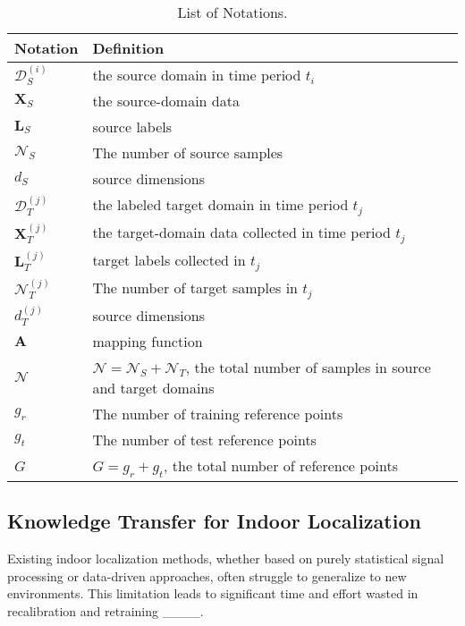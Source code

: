 \begin{table}[!t]
	\centering
	\caption{List of Notations.} %
	\label{List of Notations}
	\renewcommand{\arraystretch}{1.2} %
	\begin{tabular}{p{1.5cm} p{6.5cm}} %
		\toprule
		\textbf{Notation}   & \textbf{Definition} \\
		\midrule
		
		$\mathcal{D}_S^{\left( i \right)}$ & the source domain in time period $ t_i $  \\ 
		$\mathbf{X}_{S}$ & the source-domain data \\
		$\boldsymbol{L}_{S}$ & source labels \\
		$\mathcal{N}_S$ & The number of source samples \\
		$d_S$ & source dimensions \\
		\midrule
		
		$\mathcal{D}_{T}^{\left( j \right)}$ & the labeled target domain in time period $ t_j $ \\
		$\mathbf{X}_{T}^{\left( j \right)}$ & the target-domain data collected in time period $ t_j $\\
		$\boldsymbol{L}_{T}^{\left( j \right)}$ & target labels collected in $ t_j $\\
		$\mathcal{N}_{T}^{\left( j \right)}$ & The number of target samples in $ t_j $\\
		$d_{T}^{\left( j \right)}$ & source dimensions \\
		$\boldsymbol{A}$ & mapping function \\
		
		\midrule
		
		$\mathcal{N}$ & $\mathcal{N}=\mathcal{N}_S+\mathcal{N}_T$, the total number of samples in source and target domains \\
		$g_{r}$ & The number of training reference points \\
		$g_t$ & The number of test reference points \\
		$G$ & $ G=g_r+g_t $, the total number of reference points \\
		\bottomrule
	\end{tabular}
\end{table}

\subsection{Knowledge Transfer for Indoor Localization}
Existing indoor localization methods, whether based on purely statistical signal processing or data-driven approaches, often struggle to generalize to new environments. This limitation leads to significant time and effort wasted in recalibration and retraining ____.


